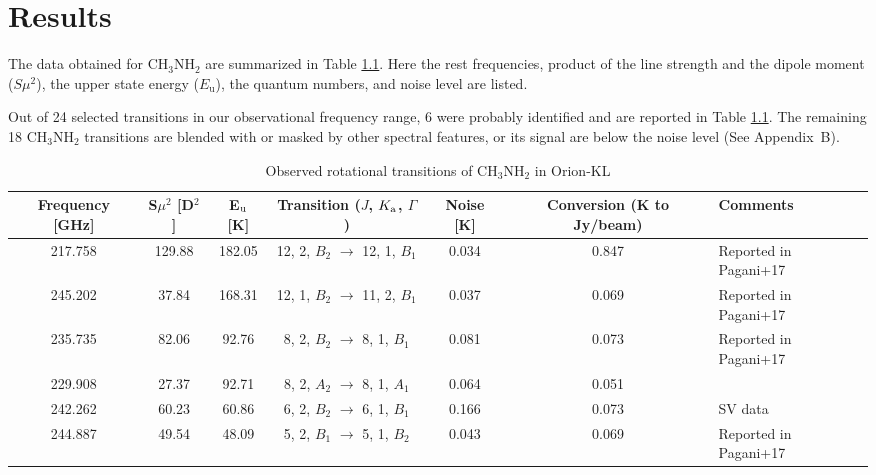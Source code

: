 \chapter{Results
  \label{chap:result}}

The data obtained for CH$_{3}$NH$_{2}$ are summarized in Table \ref{tab:MAOri}.
Here the rest frequencies, product of the line strength and the dipole moment ($S\mu^2$), the upper state energy ($E_{\mathrm{u}}$), the quantum numbers, and noise level are listed.

Out of 24 selected transitions in our observational frequency range, 
6 were probably identified and are reported in Table \ref{tab:MAOri}. 
The remaining 18 CH$_{3}$NH$_{2}$ transitions are blended with or masked by other spectral features, 
or its signal are below the noise level (See Appendix~B). 

\renewcommand{\arraystretch}{1.5}
\begin{table}[htb]
\begin{center}

  \caption{Observed rotational transitions of CH$_3$NH$_2$ in Orion-KL}
  \label{tab:MAOri}
{\scriptsize
  \begin{tabular}{ccccccl} \hline
   Frequency [GHz]& S$\mu ^{2}$ [D$^2$] & E$_{\rm{u}}$ [K]& Transition ($J$, $K_{\rm{a}}$, $\Gamma$) & Noise [K] & Conversion (K to Jy/beam) &Comments \\ \hline 
    217.758 & 129.88 & 182.05 & 12, 2, $B_{2}$ $\rightarrow$ 12, 1, $B_{1}$ &  0.034 &0.847 &Reported in Pagani+17 \\
    245.202 & 37.84 & 168.31 & 12, 1, $B_{2}$ $\rightarrow$ 11, 2, $B_{1}$ & 0.037&0.069 &Reported in Pagani+17 \\
    235.735 & 82.06 & 92.76 & 8, 2, $B_{2}$ $\rightarrow$ 8, 1, $B_{1}$ &  0.081&0.073 &Reported in Pagani+17 \\
    229.908 & 27.37 & 92.71 & 8, 2, $A_{2}$ $\rightarrow$ 8, 1, $A_{1}$ & 0.064&0.051&\\ 
    242.262 & 60.23 & 60.86 & 6, 2, $B_{2}$ $\rightarrow$ 6, 1, $B_{1}$ &  0.166 &0.073&SV data \\
    244.887 & 49.54 & 48.09 & 5, 2, $B_{1}$ $\rightarrow$ 5, 1, $B_{2}$ & 0.043 &0.069&Reported in Pagani+17 \\ \hline
  \end{tabular}
  }
\end{center}
\end{table}

